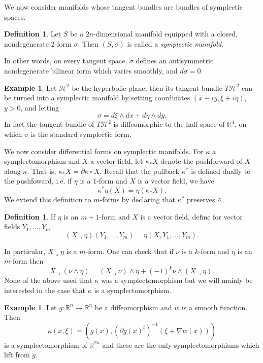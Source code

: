 \documentclass[12pt]{report}
\newcommand{\RR}{\mathbb{R}}
\newcommand{\HH}{\mathcal H}
\newcommand{\dfn}[1]{\emph{#1}\index{#1}}
\theoremstyle{definition}
\newtheorem{definition}[theorem]{Definition}
\newtheorem{example}[theorem]{Example}
\begin{document}
We now consider manifolds whose tangent bundles are bundles of symplectic spaces.
\begin{definition}
Let $S$ be a $2n$-dimensional manifold equipped with a closed, nondegenerate $2$-form $\sigma$. Then $(S, \sigma)$ is called a \dfn{symplectic manifold}.
\end{definition}
In other words, on every tangent space, $\sigma$ defines an antisymmetric nondegenerate bilinear form which varies smoothly, and $d\sigma = 0$.
\begin{example}
Let $\HH^2$ be the hyperbolic plane; then its tangent bundle $T\HH^2$ can be turned into a symplectic manifold by setting coordinates $(x + iy, \xi + i\eta)$, $y > 0$, and letting
$$\sigma = d\xi \wedge dx + d\eta \wedge dy.$$
In fact the tangent bundle of $T\HH^2$ is diffeomorphic to the half-space of $\RR^4$, on which $\sigma$ is the standard symplectic form.
\end{example}
We now consider differential forms on symplectic manifolds.
For $\kappa$ a symplectomorphism and $X$ a vector field, let $\kappa_*X$ denote the pushforward of $X$ along $\kappa$. That is, $\kappa_*X = \partial \kappa \circ X$.
Recall that the pullback $\kappa^*$ is defined dually to the pushfoward, i.e. if $\eta$ is a $1$-form and $X$ is a vector field, we have
$$\kappa^*\eta(X) = \eta(\kappa_*X).$$
We extend this definition to $m$-forms by declaring that $\kappa^*$ preserves $\wedge$.
\begin{definition}
If $\eta$ is an $m+1$-form and $X$ is a vector field, define for vector fields $Y_1, \dots, Y_m$
$$(X\lrcorner\eta)(Y_1, \dots, Y_m) = \eta(X, Y_1, \dots, Y_m).$$
\end{definition}
In particular, $X\lrcorner\eta$ is a $m$-form. One can check that if $\nu$ is a $k$-form and $\eta$ is an $m$-form then
$$X\lrcorner(\nu \wedge \eta) = (X\lrcorner\nu) \wedge \eta + (-1)^k\nu \wedge (X\lrcorner\eta).$$
None of the above used that $\kappa$ was a symplectomorphism but we will mainly be interested in the case that $\kappa$ is a symplectomorphism.

\begin{example}
Let $g: \RR^n \to \RR^n$ be a diffeomorphism and $w$ is a smooth function. Then
$$\kappa(x, \xi) = (g(x), (\partial g(x)^t)^{-1}(\xi + \nabla w(x)))$$
is a symplectomorphism of $\RR^{2n}$ and these are the only symplectomorphisms which lift from $g$.
\end{example}
\end{document}
